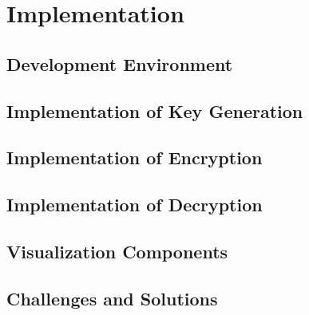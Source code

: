 \section{Implementation}
\label{chap:implementation}

\subsection{Development Environment}
\label{sec:devEnvironment}

\subsection{Implementation of Key Generation}
\label{sec:implKeyGeneration}

\subsection{Implementation of Encryption}
\label{sec:implEncryption}

\subsection{Implementation of Decryption}
\label{sec:implDecryption}

\subsection{Visualization Components}
\label{sec:visualizationComponents}

\subsection{Challenges and Solutions}
\label{sec:challengesAndSolutions}
